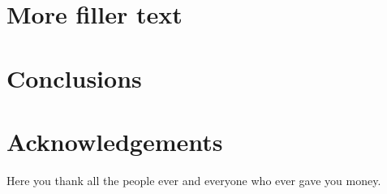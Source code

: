\documentclass[twoside,british,a4paper]{article}
\begin{document}
\section{More filler text}

\lipsum[1-6]

\section{Conclusions}

\lipsum[11-12]


\section*{Acknowledgements}
Here you thank all the people ever and everyone who ever gave you money.
\end{document}

